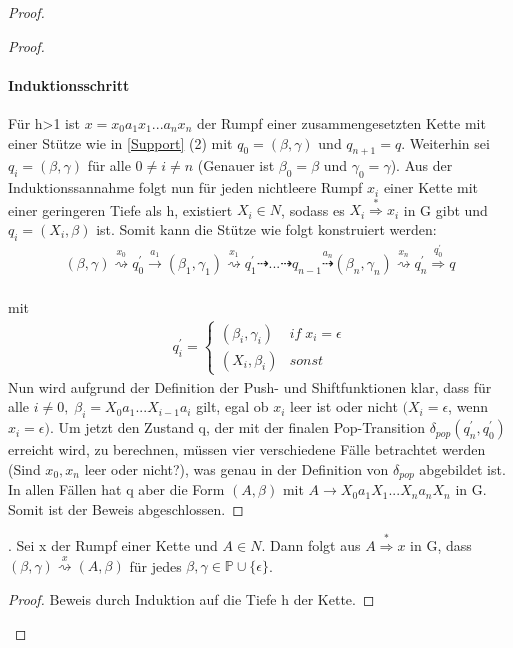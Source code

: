 \begin{proof}
\begin{proof}
\paragraph{Induktionsschritt}
Für h>1 ist $x=x_0a_1x_1...a_nx_n$ der Rumpf einer zusammengesetzten Kette mit einer Stütze wie in \autoref{Support} (2) mit $q_0=(\beta, \gamma)$ und $q_{n+1}=q$. Weiterhin sei $q_i=(\beta, \gamma)$ für alle $0 \neq i \neq n$ (Genauer ist $\beta_0 = \beta$ und $\gamma_0 = \gamma$). Aus der Induktionssannahme folgt nun für jeden nichtleere Rumpf $x_i$ einer Kette mit einer geringeren Tiefe als h, existiert $X_i \in N$, sodass es $X_i \stackrel{*}{\Rightarrow} x_i$ in G gibt und $q_i=(X_i, \beta)$ ist. Somit kann die Stütze wie folgt konstruiert werden:
 \begin{eqnarray*}
(\beta, \gamma) \stackrel{x_0}{\rightsquigarrow} q_0^{\prime} \stackrel{a_1}{\rightarrow} (\beta_1, \gamma_1) \stackrel{x_1}{\rightsquigarrow} q_1^{\prime} \dashrightarrow ... \dashrightarrow q_{n-1} \stackrel{a_n}{\dashrightarrow} (\beta_n, \gamma_n) \stackrel{x_n}{\rightsquigarrow} q_n^{\prime} \stackrel {q_0^{\prime}} {\Rightarrow} q
\end{eqnarray*}\\
mit 
\begin{eqnarray*}
q_i^\prime = \begin{cases}
(\beta_i, \gamma_i) & if \; x_i = \epsilon \\
(X_i, \beta_i) & sonst
\end{cases}
\end{eqnarray*}
Nun wird aufgrund der Definition der Push- und Shiftfunktionen klar, dass für alle $i \neq 0,\; \beta_i = X_0a_1...X_{i-1}a_i$ gilt, egal ob $x_i$ leer ist oder nicht $(X_i=\epsilon$, wenn $x_i=\epsilon)$. Um jetzt den Zustand q, der mit der finalen Pop-Transition $\delta_{pop}(q_n^\prime, q_0^\prime)$ erreicht wird, zu berechnen, müssen vier verschiedene Fälle betrachtet werden (Sind $x_0, x_n$ leer oder nicht?), was genau in der Definition von $\delta_{pop}$ abgebildet ist. In allen Fällen hat q aber die Form $(A, \beta)$ mit $A \rightarrow X_0a_1X_1...X_na_nX_n$ in G.\\
 Somit ist der Beweis abgeschlossen.
\end{proof}

\begin{lemma}.
Sei x der Rumpf einer Kette und $A \in N$. Dann folgt aus $A \stackrel{*}{\Rightarrow} x$ in G, dass $(\beta, \gamma) \stackrel{x}{\rightsquigarrow}(A, \beta)$ für jedes $\beta, \gamma \in \mathbb{P} \cup \{\epsilon\}$.
\end{lemma}
\begin{proof}
Beweis durch Induktion auf die Tiefe h der Kette. 

\end{proof}
\end{proof}
